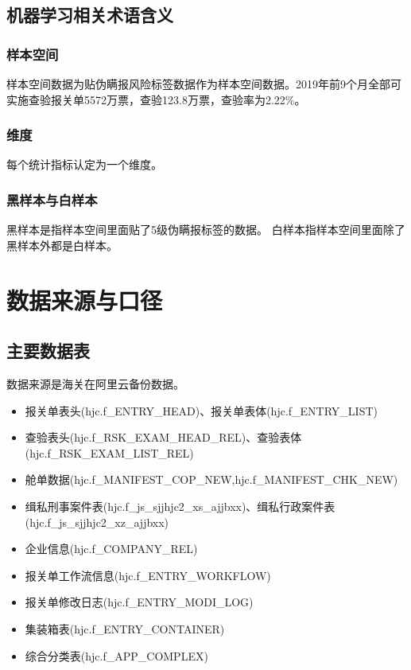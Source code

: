 \documentclass[a4paper]{tufte-book}%
\theoremstyle{definition}
\theoremstyle{definition}
\begin{document}
\section{机器学习相关术语含义}

\subsection{样本空间}
样本空间数据为贴伪瞒报风险标签数据作为样本空间数据。2019年前9个月全部可实施查验报关单5572万票，查验123.8万票，查验率为2.22\%。
\subsection{维度}
每个统计指标认定为一个维度。
\subsection{黑样本与白样本}
黑样本是指样本空间里面贴了5级伪瞒报标签的数据。
白样本指样本空间里面除了黑样本外都是白样本。





\chapter{数据来源与口径}
\section{主要数据表}
数据来源是海关在阿里云备份数据。

\begin{itemize}
     \item 报关单表头(hjc.f\_ENTRY\_HEAD)、报关单表体(hjc.f\_ENTRY\_LIST)
	 \item 查验表头(hjc.f\_RSK\_EXAM\_HEAD\_REL)、查验表体(hjc.f\_RSK\_EXAM\_LIST\_REL)
	 \item 舱单数据(hjc.f\_MANIFEST\_COP\_NEW,hjc.f\_MANIFEST\_CHK\_NEW)
	 \item 缉私刑事案件表(hjc.f\_js\_sjjhjc2\_xs\_ajjbxx)、缉私行政案件表(hjc.f\_js\_sjjhjc2\_xz\_ajjbxx)
	 \item 企业信息(hjc.f\_COMPANY\_REL)
	 \item 报关单工作流信息(hjc.f\_ENTRY\_WORKFLOW)
	 \item 报关单修改日志(hjc.f\_ENTRY\_MODI\_LOG)
	 \item 集装箱表(hjc.f\_ENTRY\_CONTAINER)
	 \item 综合分类表(hjc.f\_APP\_COMPLEX)
\end{itemize}
\end{document}
